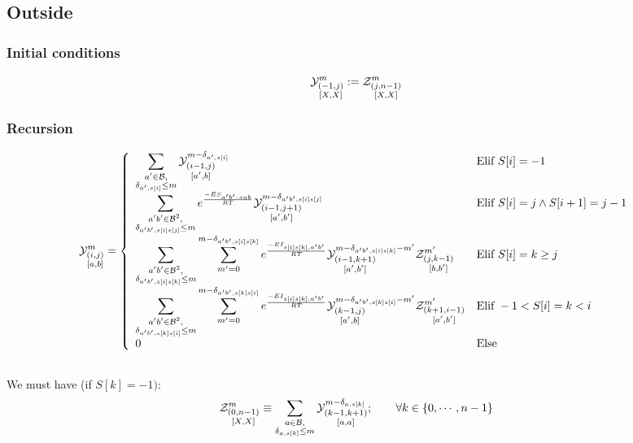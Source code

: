 \subsection{Outside}	
\subsubsection{Initial conditions}
$$
	\Y{-1,j}{m}{X,X}:=
		\displaystyle
	  \Z{j,n-1}{m}{X,X}
$$
\subsubsection{Recursion}
$$
	\Y{i,j}{m}{a,b} = \left\{
  \begin{array}{ll}
		\displaystyle
    \sum_{\substack{a'\in \B,\\ \Kron_{a',s[i]}\le m}}
    \Y{i-1,j}{m- \Kron_{a',s[i]}}{a',b} &
    \text{Elif }S[i]=-1 \\
    \displaystyle
    \sum_{\substack{a'b'\in \B^2,\\ \Kron_{a'b',s[i]s[j]}\le m}}
		 e^{\frac{-ES_{ a' b' \to a b }}{RT}}
    \Y{i-1,j+1}{m- \Kron_{a'b',s[i]s[j]}}{a',b'} &
   	 \text{Elif }S{[i]}=j \land S{[i+1]}=j-1\\
		 \displaystyle
		 \sum_{\substack{a'b'\in \B^2,\\ \Kron_{a'b',s[i]s[k]}\le m}}
		 \sum_{m'=0}^{m-\Kron_{a'b',s[i]s[k]}}
  		 e^{\frac{-EI_{s[i]s[k],a'b'}}{RT}}
		 \Y{i-1,k+1}{m- \Kron_{a'b',s[i]s[k]} - m'}{a',b'}
     \Z{j,k-1}{m'}{b,b'} &
		 \text{Elif }S{[i]}=k \geq j\\
		 \displaystyle
		 \sum_{\substack{a'b'\in \B^2,\\ \Kron_{a'b',s[k]s[i]}\le m}}
		 \sum_{m'=0}^{m-\Kron_{a'b',s[k]s[i]}}
  		 e^{\frac{-EI_{s[i]s[k],a'b'}}{RT}}
		 \Y{k-1,j}{m- \Kron_{a'b',s[k]s[i]} - m'}{a',b}
     \Z{k+1,i-1}{m'}{a',b'} &
		 \text{Elif }-1 < S{[i]}=k < i\\
		 0 & \text{Else}
  \end{array}\right.
$$
\subsection*{}
We must have (if $S[k] = -1)$:
$$
	\Z{0,n-1}{m}{X,X} \equiv     
	\sum_{\substack{a\in \B,\\ \Kron_{a,s[k]}\le m}}	
	\Y{k-1,k+1}{m-\Kron_{a,s[k]}}{a,a};\qquad
	\forall k \in \{0,\cdots,n-1\}
$$

